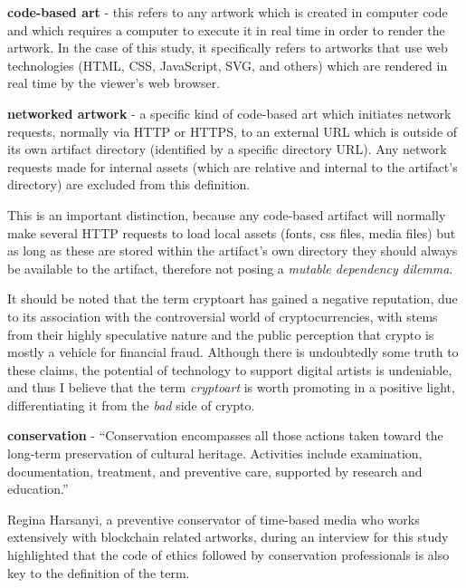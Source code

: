 \vspace{0.5cm}

\textbf{code-based art} - this refers to any artwork which is created in computer code and which requires a computer to execute it in real time in order to render the artwork. In the case of this study, it specifically refers to artworks that use web technologies (HTML, CSS, JavaScript, SVG, and others) which are rendered in real time by the viewer's web browser.

\vspace{0.5cm}

\textbf{networked artwork} - a specific kind of code-based art which initiates network requests, normally via HTTP or HTTPS, to an external URL which is outside of its own artifact directory (identified by a specific directory URL). Any network requests made for internal assets (which are relative and internal to the artifact's directory) are excluded from this definition.

This is an important distinction, because any code-based artifact will normally make several HTTP requests to load local assets (fonts, css files, media files) but as long as these are stored within the artifact's own directory they should always be available to the artifact, therefore not posing a \emph{mutable dependency dilemma}.

\vspace{0.5cm}

It should be noted that the term cryptoart has gained a negative reputation, due to its association with the controversial world of cryptocurrencies, with stems from their highly speculative nature and the public perception that crypto is mostly a vehicle for financial fraud. Although there is undoubtedly some truth to these claims, the potential of technology to support digital artists is undeniable, and thus I believe that the term \emph{cryptoart} is worth promoting in a positive light, differentiating it from the \emph{bad} side of crypto.

\vspace{0.5cm}

\textbf{conservation} - ``Conservation encompasses all those actions taken toward the long-term preservation of cultural heritage. Activities include examination, documentation, treatment, and preventive care, supported by research and education.''  \cite{WhatConservation}

\vspace{0.5cm}

Regina Harsanyi, a preventive conservator of time-based media who works extensively with blockchain related artworks, during an interview for this study highlighted that the code of ethics followed by conservation professionals is also key to the definition of the term.

